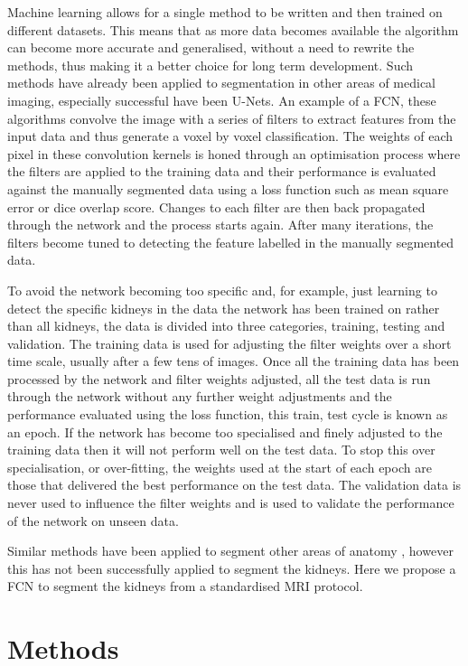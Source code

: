 Machine learning allows for a single method to be written and then trained on different datasets. This means that as more data becomes available the algorithm can become more accurate and generalised, without a need to rewrite the methods, thus making it a better choice for long term development. Such methods have already been applied to segmentation in other areas of medical imaging, especially successful have been U-Nets. An example of a \ac{FCN}, these algorithms convolve the image with a series of filters to extract features from the input data and thus generate a voxel by voxel classification. The weights of each pixel in these convolution kernels is honed through an optimisation process where the filters are applied to the training data and their performance is evaluated against the manually segmented data using a loss function such as mean square error or dice overlap score. Changes to each filter are then back propagated through the network and the process starts again. After many iterations, the filters become tuned to detecting the feature labelled in the manually segmented data. 

To avoid the network becoming too specific and, for example, just learning to detect the specific kidneys in the data the network has been trained on rather than all kidneys, the data is divided into three categories, training, testing and validation. The training data is used for adjusting the filter weights over a short time scale, usually after a few tens of images. Once all the training data has been processed by the network and filter weights adjusted, all the test data is run through the network without any further weight adjustments and the performance evaluated using the loss function, this train, test cycle is known as an epoch. If the network has become too specialised and finely adjusted to the training data then it will not perform well on the test data. To stop this over specialisation, or over-fitting, the weights used at the start of each epoch are those that delivered the best performance on the test data. The validation data is never used to influence the filter weights and is used to validate the performance of the network on unseen data.

Similar methods have been applied to segment other areas of anatomy \cite{wachinger_deepnat_2018, lu_automatic_2017}, however this has not been successfully applied to segment the kidneys. Here we propose a \ac{FCN} to segment the kidneys from a standardised \ac{MRI} protocol.

\newpage
\section{Methods}

